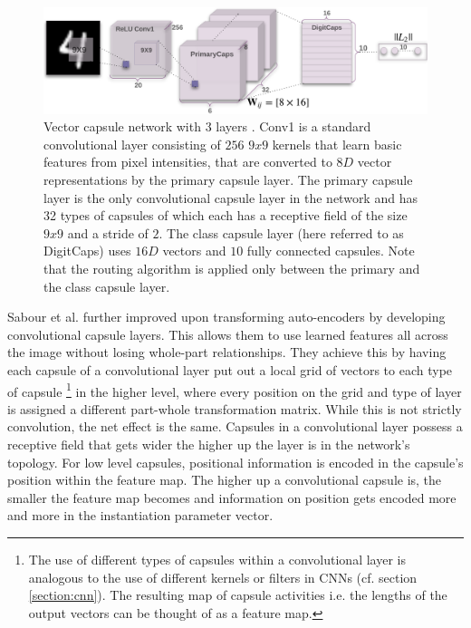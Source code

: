 \begin{figure}
    \centering
    \includegraphics[width=\textwidth]{figures/vector-capsules.png}
\caption[Vector capsule network with 3 layers]{Vector capsule network with 3 layers \cite{sabour2017dynamic}. Conv1 is a standard convolutional layer consisting of $\num{256}$ $9x9$ kernels that learn basic features from pixel intensities, that are converted to $8D$ vector representations by the primary capsule layer. The primary capsule layer is the only convolutional capsule layer in the network and has 32 types of capsules of which each has a receptive field of the size $9x9$ and a stride of $\num{2}$. The class capsule layer (here referred to as DigitCaps) uses $16D$ vectors and $\num{10}$ fully connected capsules. Note that the routing algorithm is applied only between the primary and the class capsule layer.}\label{fig:vector-capsules}
\end{figure}\noindent

Sabour et al. further improved upon transforming auto-encoders by developing convolutional capsule layers. This allows them to use learned features all across the image without losing whole-part relationships. They achieve this by having each capsule of a convolutional layer put out a local grid of vectors to each type of capsule \footnote{The use of different types of capsules within a convolutional layer is analogous to the use of different kernels or filters in CNNs (cf. section \ref{section:cnn}). The resulting map of capsule activities i.e. the lengths of the output vectors can be thought of as a feature map.} in the higher level, where every position on the grid and type of layer is assigned a different part-whole transformation matrix. While this is not strictly convolution, the net effect is the same. Capsules in a convolutional layer possess a receptive field that gets wider the higher up the layer is in the network's topology. For low level capsules, positional information is encoded in the capsule's position within the feature map. The higher up a convolutional capsule is, the smaller the feature map becomes and information on position gets encoded more and more in the instantiation parameter vector.


